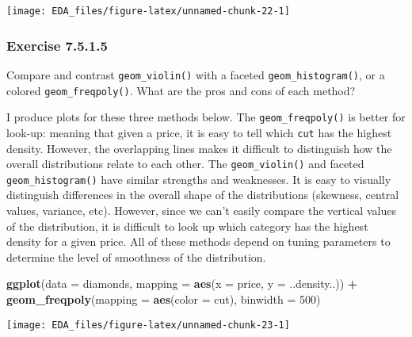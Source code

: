 \documentclass[]{book}
\newenvironment{Shaded}{\begin{snugshade}}{\end{snugshade}}
\newcommand{\DataTypeTok}[1]{\textcolor[rgb]{0.13,0.29,0.53}{#1}}
\newcommand{\DecValTok}[1]{\textcolor[rgb]{0.00,0.00,0.81}{#1}}
\newcommand{\KeywordTok}[1]{\textcolor[rgb]{0.13,0.29,0.53}{\textbf{#1}}}
\newcommand{\NormalTok}[1]{#1}
\newcommand{\OperatorTok}[1]{\textcolor[rgb]{0.81,0.36,0.00}{\textbf{#1}}}
\newcommand{\StringTok}[1]{\textcolor[rgb]{0.31,0.60,0.02}{#1}}
\theoremstyle{plain}
\theoremstyle{remark}
\theoremstyle{definition}
\theoremstyle{definition}
\theoremstyle{definition}
\theoremstyle{remark}
\begin{document}
\begin{center}\texttt{[image: EDA\_files/figure-latex/unnamed-chunk-22-1]} \end{center}

\hypertarget{exercise-7.5.1.5}{%
\subsubsection*{\texorpdfstring{Exercise
{7.5.1.5}}{Exercise 7.5.1.5}}\label{exercise-7.5.1.5}}

Compare and contrast \texttt{geom\_violin()} with a faceted
\texttt{geom\_histogram()}, or a colored \texttt{geom\_freqpoly()}. What
are the pros and cons of each method?

I produce plots for these three methods below. The
\texttt{geom\_freqpoly()} is better for look-up: meaning that given a
price, it is easy to tell which \texttt{cut} has the highest density.
However, the overlapping lines makes it difficult to distinguish how the
overall distributions relate to each other. The \texttt{geom\_violin()}
and faceted \texttt{geom\_histogram()} have similar strengths and
weaknesses. It is easy to visually distinguish differences in the
overall shape of the distributions (skewness, central values, variance,
etc). However, since we can't easily compare the vertical values of the
distribution, it is difficult to look up which category has the highest
density for a given price. All of these methods depend on tuning
parameters to determine the level of smoothness of the distribution.

\begin{Shaded}
\begin{Highlighting}[]
\KeywordTok{ggplot}\NormalTok{(}\DataTypeTok{data =}\NormalTok{ diamonds, }\DataTypeTok{mapping =} \KeywordTok{aes}\NormalTok{(}\DataTypeTok{x =}\NormalTok{ price, }\DataTypeTok{y =}\NormalTok{ ..density..)) }\OperatorTok{+}
\StringTok{  }\KeywordTok{geom_freqpoly}\NormalTok{(}\DataTypeTok{mapping =} \KeywordTok{aes}\NormalTok{(}\DataTypeTok{color =}\NormalTok{ cut), }\DataTypeTok{binwidth =} \DecValTok{500}\NormalTok{)}
\end{Highlighting}
\end{Shaded}

\begin{center}\texttt{[image: EDA\_files/figure-latex/unnamed-chunk-23-1]} \end{center}
\end{document}
